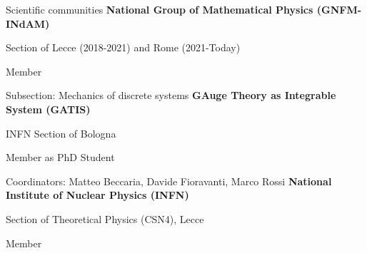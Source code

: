 \begin{rubric}{Scientific communities}
\entry*[2018 -- today]
  \textbf{National Group of Mathematical Physics (GNFM-INdAM)}\par Section of Lecce (2018-2021) and Rome (2021-Today)\par Member\par Subsection: Mechanics of discrete systems
\entry*[2016 -- 2017]
  \textbf{GAuge Theory as Integrable System (GATIS)}\par INFN Section of Bologna\par Member as PhD Student\par Coordinators: Matteo Beccaria, Davide Fioravanti, Marco Rossi
\entry*[2015 -- 2021]
  \textbf{National Institute of Nuclear Physics (INFN)}\par Section of Theoretical Physics (CSN4), Lecce\par Member
\end{rubric}
